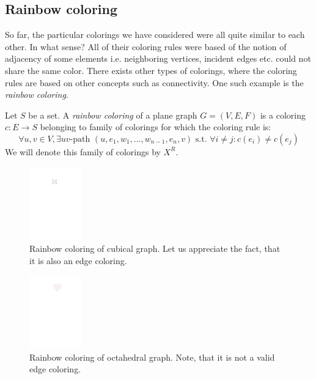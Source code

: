 \begin{highlight}
\subsection{Rainbow coloring}

So far, the particular colorings we have considered were all quite similar to each other. In what sense? All of their coloring rules were based of the notion of adjacency of some elements i.e. neighboring vertices, incident edges etc. could not share the same color. There exists other types of colorings, where the coloring rules are based on other concepts such as connectivity. One such example is the \textit{rainbow coloring}.

\begin{definition}
    Let $S$ be a set. A \textit{rainbow coloring} of a plane graph $G=(V,E,F)$ is a coloring $c: E \rightarrow S$ belonging to family of colorings for which the coloring rule is: 
    \begin{equation}\label{eqn:rainbow_rule}
     \forall u,v \in V, \exists uv \text{-path } (u,e_1,w_1, \ldots ,w_{n-1},e_n,v) \text{ s.t. } \forall i \neq j : c(e_i) \neq c(e_j) \tag{$R_R$}
    \end{equation}
    We will denote this family of colorings by $X^R$.
\end{definition}

\begin{figure}[H]
    \centering
    \includegraphics[width=0.2\textwidth]{../Resources/Figs/cubical_edg_colr.pdf}
    \caption{Rainbow coloring of cubical graph. Let us appreciate the fact, that it is also an edge coloring.}
    \label{fig:cubical_rainbow_coloring}
\end{figure}

\begin{figure}[H]
    \centering
    \includegraphics[width=0.2\textwidth]{../Resources/Figs/octahedral_rainbow_colr.pdf}
    \caption{Rainbow coloring of octahedral graph. Note, that it is not a valid edge coloring.}
    \label{fig:octahedral_rainbow_coloring}
\end{figure}


\end{highlight}
